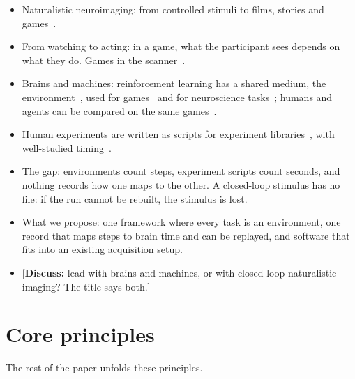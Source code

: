 \documentclass{article}
\newcommand{\question}[1]{\textcolor{blue!70!black}{[\textbf{Discuss:} #1]}}
\begin{document}
\begin{itemize}
  \item Naturalistic neuroimaging: from controlled stimuli to films, stories and games~\citep{sonkusare2019naturalistic,nastase2020keepitreal}.
  \item From watching to acting: in a game, what the participant sees depends on what they do. Games in the scanner~\citep{cross2021deep,tomov2023neural,harel2023controller,boyle2025cneuromod}.
  \item Brains and machines: reinforcement learning has a shared medium, the environment~\citep{brockman2016gym,towers2024gymnasium}, used for games~\citep{bellemare2013ale,mnih2015dqn} and for neuroscience tasks~\citep{molanomazon2022neurogym}; humans and agents can be compared on the same games~\citep{tsividis2021human}.
  \item Human experiments are written as scripts for experiment libraries~\citep{peirce2019psychopy,pallier2026goxpyriment}, with well-studied timing~\citep{bridges2020timing}.
  \item The gap: environments count steps, experiment scripts count seconds, and nothing records how one maps to the other. A closed-loop stimulus has no file: if the run cannot be rebuilt, the stimulus is lost.
  \item What we propose: one framework where every task is an environment, one record that maps steps to brain time and can be replayed, and software that fits into an existing acquisition setup.
  \item \question{lead with brains and machines, or with closed-loop naturalistic imaging? The title says both.}
\end{itemize}

\section{Core principles}
\label{sec:principles}

The rest of the paper unfolds these principles.
\end{document}
